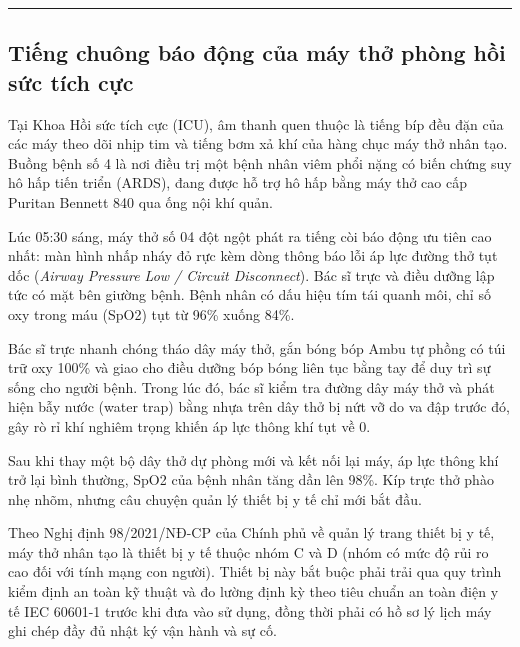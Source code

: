\documentclass[12pt,a4paper]{article}
\begin{document}
\vspace{0.8em}
\noindent\rule{\textwidth}{0.4pt}

\subsection{Tiếng chuông báo động của máy thở phòng hồi sức tích cực}

Tại Khoa Hồi sức tích cực (ICU), âm thanh quen thuộc là tiếng bíp đều đặn của các máy theo dõi nhịp tim và tiếng bơm xả khí của hàng chục máy thở nhân tạo. Buồng bệnh số 4 là nơi điều trị một bệnh nhân viêm phổi nặng có biến chứng suy hô hấp tiến triển (ARDS), đang được hỗ trợ hô hấp bằng máy thở cao cấp Puritan Bennett 840 qua ống nội khí quản.

Lúc 05:30 sáng, máy thở số 04 đột ngột phát ra tiếng còi báo động ưu tiên cao nhất: màn hình nhấp nháy đỏ rực kèm dòng thông báo lỗi áp lực đường thở tụt dốc (\textit{Airway Pressure Low / Circuit Disconnect}). Bác sĩ trực và điều dưỡng lập tức có mặt bên giường bệnh. Bệnh nhân có dấu hiệu tím tái quanh môi, chỉ số oxy trong máu (SpO2) tụt từ 96\% xuống 84\%.

Bác sĩ trực nhanh chóng tháo dây máy thở, gắn bóng bóp Ambu tự phồng có túi trữ oxy 100\% và giao cho điều dưỡng bóp bóng liên tục bằng tay để duy trì sự sống cho người bệnh. Trong lúc đó, bác sĩ kiểm tra đường dây máy thở và phát hiện bẫy nước (water trap) bằng nhựa trên dây thở bị nứt vỡ do va đập trước đó, gây rò rỉ khí nghiêm trọng khiến áp lực thông khí tụt về 0.

Sau khi thay một bộ dây thở dự phòng mới và kết nối lại máy, áp lực thông khí trở lại bình thường, SpO2 của bệnh nhân tăng dần lên 98\%. Kíp trực thở phào nhẹ nhõm, nhưng câu chuyện quản lý thiết bị y tế chỉ mới bắt đầu.

Theo Nghị định 98/2021/NĐ-CP của Chính phủ về quản lý trang thiết bị y tế, máy thở nhân tạo là thiết bị y tế thuộc nhóm C và D (nhóm có mức độ rủi ro cao đối với tính mạng con người). Thiết bị này bắt buộc phải trải qua quy trình kiểm định an toàn kỹ thuật và đo lường định kỳ theo tiêu chuẩn an toàn điện y tế IEC 60601-1 trước khi đưa vào sử dụng, đồng thời phải có hồ sơ lý lịch máy ghi chép đầy đủ nhật ký vận hành và sự cố.
\end{document}

